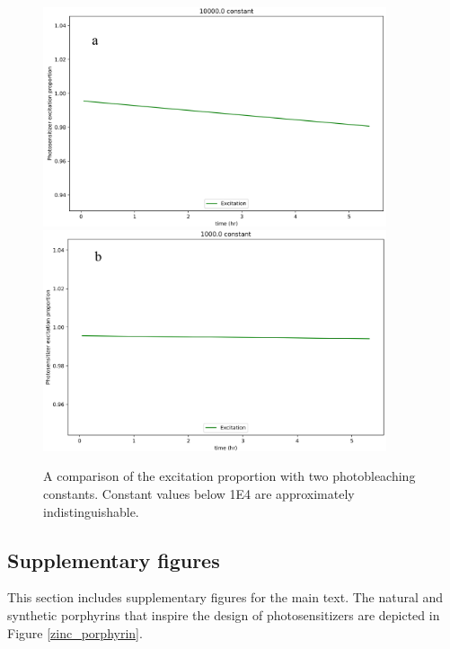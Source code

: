 \begin{figure}
    \centering
    \includegraphics[width = 0.9\textwidth]{images/PDIpy/sensitivity_analyses/photobleaching_constant/1E4.png} \\
    \vspace{5mm}
    \midrule
    \vspace{5mm}
    \includegraphics[width = 0.9\textwidth]{images/PDIpy/sensitivity_analyses/photobleaching_constant/1E3.png}
    \caption{
        A comparison of the excitation proportion with two photobleaching constants. Constant values below 1E4 are approximately indistinguishable.
    }
    \label{photosensitizing_constant}
\end{figure}


\subsection{Supplementary figures}
This section includes supplementary figures for the main text. The natural and synthetic porphyrins that inspire the design of photosensitizers are depicted in Figure \ref{zinc_porphyrin}. 

